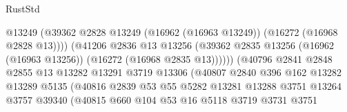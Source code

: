 \begin{lexlean}{RustStd}
\begin{coremodule}
                                            @13249
                                            (@39362
                                              @2828
                                              @13249
                                              (@16962 (@16963 @13249))
                                              (@16272 (@16968 @2828 @13))))
                                          (@41206
                                            @2836
                                            @13
                                            @13256
                                            (@39362
                                              @2835
                                              @13256
                                              (@16962 (@16963 @13256))
                                              (@16272 (@16968 @2835 @13))))))
                                      (@40796
                                        @2841
                                        @2848
                                        @2855
                                        @13
                                        @13282
                                        @13291
                                        @3719
                                        @13306
                                        (@40807
                                          @2840
                                          @396
                                          @162
                                          @13282
                                          @13289
                                          @5135
                                          (@40816
                                            @2839
                                            @53
                                            @55
                                            @5282
                                            @13281
                                            @13288
                                            @3751
                                            @13264
                                            @3757
                                            @39340
                                            (@40815
                                              @660
                                              @104
                                              @53
                                              @16
                                              @5118
                                              @3719
                                              @3731
                                              @3751

\end{coremodule}
\end{lexlean}
